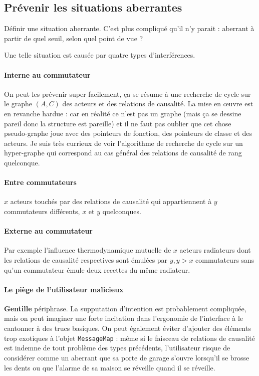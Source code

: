 \documentclass[11pt]{article}
\begin{document}
\subsection{Prévenir les situations aberrantes}

Définir une situation aberrante. C'est plus compliqué qu'il n'y parait : aberrant à partir de quel seuil, selon quel point de vue ?

Une telle situation est causée par quatre types d'interférences.

\paragraph{Interne au commutateur} On peut les prévenir super facilement, ça se résume à une recherche de cycle sur le graphe $(A, C)$ des acteurs et des relations de causalité. La mise en œuvre est en revanche hardue : car en réalité ce n'est pas un graphe (mais ça se dessine pareil donc la structure est pareille) et il ne faut pas oublier que cet chose pseudo-graphe joue avec des pointeurs de fonction, des pointeurs de classe et des acteurs. Je suis très currieux de voir l'algorithme de recherche de cycle sur un hyper-graphe qui correspond au cas général des relations de causalité de rang quelconque.

\paragraph{Entre commutateurs} $x$ acteurs touchés par des relations de causalité qui appartiennent à $y$ commutateurs différents, $x$ et $y$ quelconques.

\paragraph{Externe au commutateur} Par exemple l'influence thermodynamique mutuelle de $x$ acteurs radiateurs dont les relations de causalité respectives sont émulées par $y, y > x$ commutateurs sans qu'un commutateur émule deux recettes du même radiateur.

\paragraph{Le piège de l'utilisateur malicieux} \textbf{Gentille} périphrase. La supputation d'intention est probablement compliquée, mais on peut imaginer une forte incitation dans l'ergonomie de l'interface à le cantonner à des trucs basiques. On peut également éviter d'ajouter des éléments trop exotiques à l'objet \texttt{MessageMap} : même si le faisceau de relations de causalité est indemne de tout problème des types précédents, l'utilisateur risque de considérer comme un aberrant que sa porte de garage s'ouvre lorsqu'il se brosse les dents ou que l'alarme de sa maison se réveille quand il se réveille.
\end{document}
